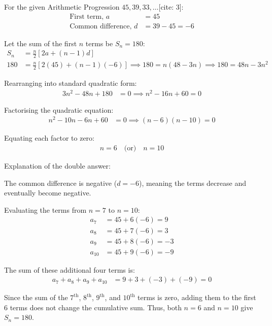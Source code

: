 \begin{enumerate}[label=\thesubsection.\arabic*, ref=\thesubsection.\theenumi]
	\solution
	For the given Arithmetic Progression $45, 39, 33, \ldots$[cite: 3]:
	\begin{align*}
		\text{First term, } a &= 45 \\
		\text{Common difference, } d &= 39 - 45 = -6
	\end{align*}
	
	Let the sum of the first $n$ terms be $S_n = 180$:
	\begin{align*}
		S_n &= \frac{n}{2}\left[2a + (n - 1)d\right] \\
		180 &= \frac{n}{2}\left[2(45) + (n - 1)(-6)\right] \implies
		180 = n(48 - 3n) \implies
		180 = 48n - 3n^2
	\end{align*}
	
	Rearranging into standard quadratic form:
	\begin{align*}
		3n^2 - 48n + 180 &= 0 \implies
		n^2 - 16n + 60 = 0
	\end{align*}
	
	Factorising the quadratic equation:
	\begin{align*}
		n^2 - 10n - 6n + 60 &= 0 \implies
		(n - 6)(n - 10) = 0
	\end{align*}
	
	Equating each factor to zero:
	\begin{align*}
		n = 6 \quad \text{(or)} \quad n = 10
	\end{align*}
	
	Explanation of the double answer:
	
	The common difference is negative ($d = -6$), meaning the terms decrease and eventually become negative.
	
	Evaluating the terms from $n = 7$ to $n = 10$:
	\begin{align*}
		a_7 &= 45 + 6(-6) = 9 \\
		a_8 &= 45 + 7(-6) = 3 \\
		a_9 &= 45 + 8(-6) = -3 \\
		a_{10} &= 45 + 9(-6) = -9
	\end{align*}
	
	The sum of these additional four terms is:
	\begin{align*}
		a_7 + a_8 + a_9 + a_{10} &= 9 + 3 + (-3) + (-9) = 0
	\end{align*}
	
	Since the sum of the $7^{\text{th}}$, $8^{\text{th}}$, $9^{\text{th}}$, and $10^{\text{th}}$ terms is zero, adding them to the first 6 terms does not change the cumulative sum. Thus, both $n = 6$ and $n = 10$ give $S_n = 180$.
	

\end{enumerate}
